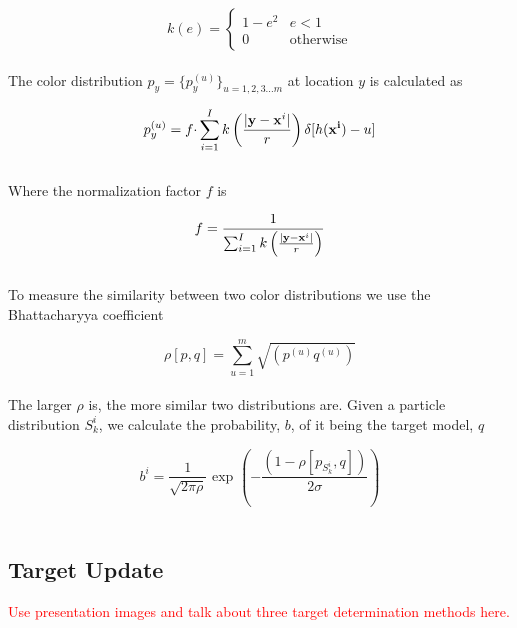 \documentclass[11pt]{article}
\begin{document}
\begin{equation}
k(e) = \begin{cases}
 1 - e^2  & \text{$e < 1$} \\
 0            & \text{otherwise}
\end{cases}
\label{eq:kdist}
\end{equation} \\

The color distribution $p_y = \{p_y^{(u)}\}_{u = 1,2,3 \dots m}$ at location $y$ is calculated as

\begin{equation}
p_y^{(u)} = f \cdotp \sum^I_{i=1} k \left ( \frac{| {\bf y} - {\bf x}^i|}{r} \right ) \delta [h({\bf x^i})-u]
\label{eq:cdist}
\end{equation} \\

Where the normalization factor $f$ is

\begin{equation}
f = \frac{1}{\sum^I_{i=1} k \left ( \frac{| {\bf y} - {\bf x}^i|}{r} \right )}
\label{eq:normfact}
\end{equation} \\

To measure the similarity between two color distributions we use the Bhattacharyya coefficient

\begin{equation}
\rho[p,q] = \sum^m_{u=1} \sqrt{ (p^{(u)} q^{(u)}) } 
\label{eq:bcoeff}
\end{equation} \\

The larger $\rho$ is, the more similar two distributions are. Given a particle distribution $S_k^i$, we calculate the probability, $b$, of it being the target model, $q$

\begin{equation}
b^i = \frac{1}{\sqrt{2\pi\rho}} \text{ exp } \left ( - \frac{(1-\rho[p_{S_k^i},q])}{2\sigma} \right )
\label{eq:bprob}
\end{equation} \\


\subsection{Target Update}

\textcolor{red}{Use presentation images and talk about three target determination methods here.} \\
\end{document}
